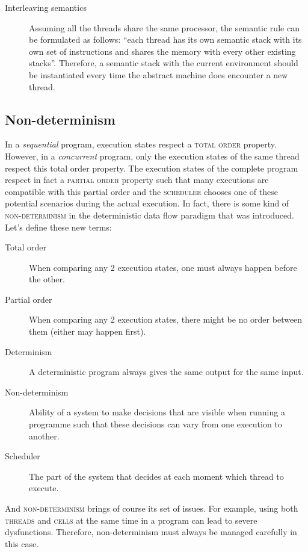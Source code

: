 \documentclass[11pt,a4paper,twoside,openright]{report}
\begin{document}
\begin{description}
 \item[Interleaving semantics] Assuming all the threads share the same 
processor, the semantic rule can be formulated as follows: \enquote{each 
thread has its own semantic stack with its own set of instructions and shares 
the memory with every other existing stacks}. Therefore, a semantic stack with 
the current environment should be instantiated every time the abstract machine 
does encounter a new thread.
\end{description}

\subsection{Non-determinism}
In a \textit{sequential} program, execution states respect a \textsc{total 
order} property. However, in a  \textit{concurrent} program, only the execution 
states of the same thread respect this total order property. The execution 
states of the complete program respect in fact a \textsc{partial order} 
property 
such that many executions are compatible with this partial order and the 
\textsc{scheduler} chooses one of these potential scenarios during the actual 
execution. In fact, there is some kind of \textsc{non-determinism} in the 
deterministic data flow paradigm that was introduced. Let's define these new 
terms:

\begin{description}
 \item[Total order] When comparing any 2 execution states, one must always 
happen before the other.
 \item[Partial order] When comparing any 2 execution states, there might be no 
order between them (either may happen first).
 \item[Determinism] A deterministic program always gives the same output for 
the same input.
 \item[Non-determinism] Ability of a system to make decisions that are visible 
when running a programme such that these decisions can vary from one execution to 
another.
 \item[Scheduler] The part of the system that decides at each moment which 
thread to execute.
\end{description}

And \textsc{non-determinism} brings of course its set of issues. For example, 
using both \textsc{threads} and \textsc{cells} at the same time in a program 
can 
lead to severe dysfunctions. Therefore, non-determinism must always be managed 
carefully in this case.\\
\end{document}

